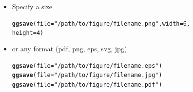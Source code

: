 \documentclass{beamer}\usepackage[]{graphicx}\usepackage[]{color}
\makeatletter
\newcommand{\hlnum}[1]{\textcolor[rgb]{0.686,0.059,0.569}{#1}}%
\newcommand{\hlstr}[1]{\textcolor[rgb]{0.192,0.494,0.8}{#1}}%
\newcommand{\hlstd}[1]{\textcolor[rgb]{0.345,0.345,0.345}{#1}}%
\newcommand{\hlkwc}[1]{\textcolor[rgb]{0.333,0.667,0.333}{#1}}%
\newcommand{\hlkwd}[1]{\textcolor[rgb]{0.737,0.353,0.396}{\textbf{#1}}}%
\newenvironment{kframe}{%
 \def\at@end@of@kframe{}%
 \ifinner\ifhmode%
  \def\at@end@of@kframe{\end{minipage}}%
  \begin{minipage}{\columnwidth}%
 \fi\fi%
 \def\FrameCommand##1{\hskip\@totalleftmargin \hskip-\fboxsep
 \colorbox{shadecolor}{##1}\hskip-\fboxsep
     \hskip-\linewidth \hskip-\@totalleftmargin \hskip\columnwidth}%
 \MakeFramed {\advance\hsize-\width
   \@totalleftmargin\z@ \linewidth\hsize
   \@setminipage}}%
 {\par\unskip\endMakeFramed%
 \at@end@of@kframe}
\newenvironment{knitrout}{}{} %
\makeatother
\begin{document}
\begin{frame}[fragile]
\begin{itemize}
\item Specify a size
\begin{knitrout}\footnotesize
{}\color{fgcolor}\begin{kframe}
\begin{alltt}
\hlkwd{ggsave}\hlstd{(}\hlkwc{file} \hlstd{=} \hlstr{"/path/to/figure/filename.png"}\hlstd{,} \hlkwc{width} \hlstd{=} \hlnum{6}\hlstd{,}
\hlkwc{height} \hlstd{=}\hlnum{4}\hlstd{)}
\end{alltt}
\end{kframe}
\end{knitrout}
\item or any format (pdf, png, eps, svg, jpg)
\begin{knitrout}\footnotesize
{}\color{fgcolor}\begin{kframe}
\begin{alltt}
\hlkwd{ggsave}\hlstd{(}\hlkwc{file} \hlstd{=} \hlstr{"/path/to/figure/filename.eps"}\hlstd{)}
\hlkwd{ggsave}\hlstd{(}\hlkwc{file} \hlstd{=} \hlstr{"/path/to/figure/filename.jpg"}\hlstd{)}
\hlkwd{ggsave}\hlstd{(}\hlkwc{file} \hlstd{=} \hlstr{"/path/to/figure/filename.pdf"}\hlstd{)}
\end{alltt}
\end{kframe}
\end{knitrout}
\end{itemize}
\end{frame}

\end{document}
